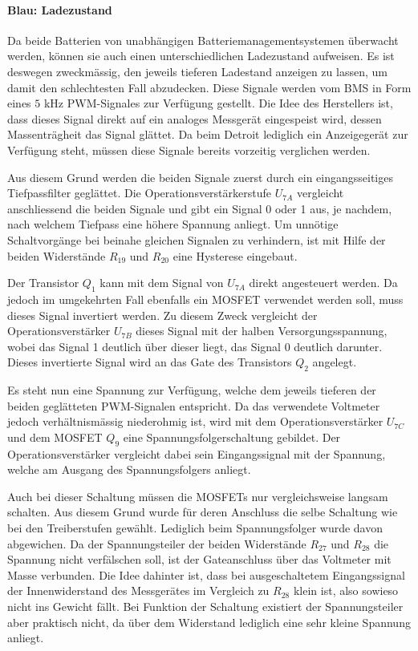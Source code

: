 \paragraph{Blau: Ladezustand}
Da beide Batterien von unabhängigen Batteriemanagementsystemen überwacht werden, können sie auch einen unterschiedlichen Ladezustand aufweisen. Es ist deswegen zweckmässig, den jeweils tieferen Ladestand anzeigen zu lassen, um damit den schlechtesten Fall abzudecken. Diese Signale werden vom BMS in Form eines $5$ kHz PWM-Signales zur Verfügung gestellt. Die Idee des Herstellers ist, dass dieses Signal direkt auf ein analoges Messgerät eingespeist wird, dessen Massenträgheit das Signal glättet. Da beim Detroit lediglich ein Anzeigegerät zur Verfügung steht, müssen diese Signale bereits vorzeitig verglichen werden.

Aus diesem Grund werden die beiden Signale zuerst durch ein eingangsseitiges Tiefpassfilter geglättet. Die Operationsverstärkerstufe $U_{7A}$ vergleicht anschliessend die beiden Signale und gibt ein Signal 0 oder 1 aus, je nachdem, nach welchem Tiefpass eine höhere Spannung anliegt. Um unnötige Schaltvorgänge bei beinahe gleichen Signalen zu verhindern, ist mit Hilfe der beiden Widerstände $R_{19}$ und $R_{20}$ eine Hysterese eingebaut.

Der Transistor $Q_1$ kann mit dem Signal von $U_{7A}$ direkt angesteuert werden. Da jedoch im umgekehrten Fall ebenfalls ein MOSFET verwendet werden soll, muss dieses Signal invertiert werden. Zu diesem Zweck vergleicht der Operationsverstärker $U_{7B}$ dieses Signal mit der halben Versorgungsspannung, wobei das Signal 1 deutlich über dieser liegt, das Signal 0 deutlich darunter. Dieses invertierte Signal wird an das Gate des Transistors $Q_2$ angelegt.

Es steht nun eine Spannung zur Verfügung, welche dem jeweils tieferen der beiden geglätteten PWM-Signalen entspricht. Da das verwendete Voltmeter jedoch verhältnismässig niederohmig ist, wird mit dem Operationsverstärker $U_{7C}$ und dem MOSFET $Q_9$ eine Spannungsfolgerschaltung gebildet. Der Operationsverstärker vergleicht dabei sein Eingangssignal mit der Spannung, welche am Ausgang des Spannungsfolgers anliegt.

Auch bei dieser Schaltung müssen die MOSFETs nur vergleichsweise langsam schalten. Aus diesem Grund wurde für deren Anschluss die selbe Schaltung wie bei den Treiberstufen gewählt. Lediglich beim Spannungsfolger wurde davon abgewichen. Da der Spannungsteiler der beiden Widerstände $R_{27}$ und $R_{28}$ die Spannung nicht verfälschen soll, ist der Gateanschluss über das Voltmeter mit Masse verbunden. Die Idee dahinter ist, dass bei ausgeschaltetem Eingangssignal der Innenwiderstand des Messgerätes im Vergleich zu $R_{28}$ klein ist, also sowieso nicht ins Gewicht fällt. Bei Funktion der Schaltung existiert der Spannungsteiler aber praktisch nicht, da über dem Widerstand lediglich eine sehr kleine Spannung anliegt.